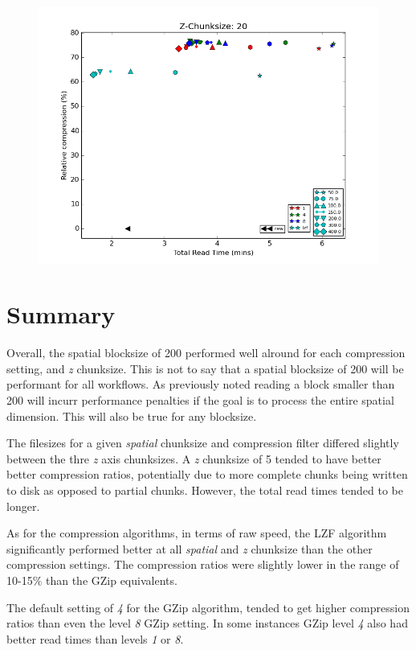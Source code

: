 \documentclass[a4paper]{article}
\begin{document}
      \begin{figure}[h!]
        \centering
        \includegraphics[scale=0.5]{Compression-ratio-vs-Read-time-z_chunk-20_raw.png}
      \end{figure}

  \newpage

  \section{Summary}

    \begin{flushleft}
    Overall, the spatial blocksize of 200 performed well alround for each compression setting, and \textit{z} chunksize. This is not to say that a spatial blocksize of 200 will be performant for all workflows. As previously noted reading a block smaller than 200 will incurr performance penalties if the goal is to process the entire spatial dimension. This will also be true for any blocksize. \par
    The filesizes for a given \textit{spatial} chunksize and compression filter differed slightly between the thre \textit{z} axis chunksizes. A \textit{z} chunksize of 5 tended to have better better compression ratios, potentially due to more complete chunks being written to disk as opposed to partial chunks. However, the total read times tended to be longer. \par
    As for the compression algorithms, in terms of raw speed, the LZF algorithm significantly performed better at all \textit{spatial} and \textit{z} chunksize than the other compression settings. The compression ratios were slightly lower in the range of 10-15\% than the GZip equivalents. \par
    The default setting of \textit{4} for the GZip algorithm, tended to get higher compression ratios than even the level \textit{8} GZip setting. In some instances GZip level \textit{4} also had better read times than levels \textit{1} or \textit{8}.
    \end{flushleft}
\end{document}
